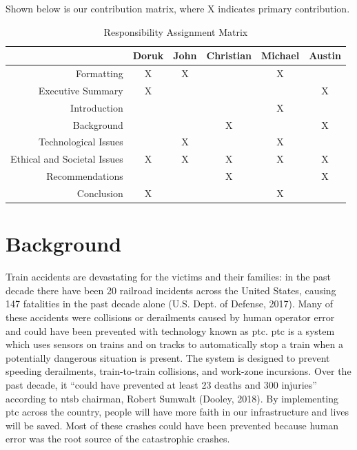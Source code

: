 \documentclass[11pt, titlepage]{article}
\begin{document}
Shown below is our contribution matrix, where X indicates primary contribution.

\begin{table}[htbp]
    \begin{center}
        \caption{Responsibility Assignment Matrix}
        \begin{tabular}{r|c c c c c }
            & Doruk & John & Christian & Michael & Austin\\
            \hline
            Formatting & X & X & & X & \\
            Executive Summary & X & & & & X \\
            Introduction & & & & X & \\
            Background & & & X & & X\\
            Technological Issues & & X & & X & \\
            Ethical and Societal Issues & X & X & X & X & X\\
            Recommendations & & & X & & X\\
            Conclusion & X & & & X & \\
        \end{tabular}
    \end{center}
\end{table}

\clearpage
\pagebreak

\section{Background}

Train accidents are devastating for the victims and their families: in the past
decade there have been 20 railroad incidents across the United States, causing
147 fatalities in the past decade alone (U.S. Dept. of Defense, 2017). Many of these
accidents were collisions or derailments caused by human
operator error and could have been prevented with technology known as \gls{ptc}.
\gls{ptc} is a system which uses sensors on trains and on tracks to automatically
stop a train when a potentially dangerous situation is present. The system is
designed to prevent speeding derailments, train-to-train collisions, and
work-zone incursions. Over the past decade, it ``could have prevented at least 23
deaths and 300 injuries'' according to \gls{ntsb} chairman, Robert Sumwalt
(Dooley, 2018). By implementing \gls{ptc} across the country, people will have
more faith in our infrastructure and lives will be saved. Most of these crashes
could have been prevented because human error was the root source of the
catastrophic crashes.
\end{document}

